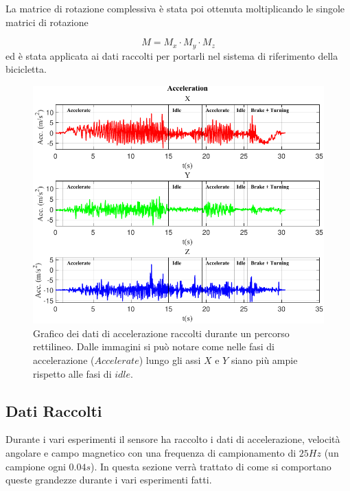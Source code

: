 \documentclass[class=article]{standalone}
\begin{document}
	La matrice di rotazione complessiva è stata poi ottenuta moltiplicando le singole matrici di rotazione 
	
	\[M=M_{x}\cdot M_{y}\cdot M_{z}\]
	ed è stata applicata ai dati raccolti per portarli nel sistema di riferimento della bicicletta.
	
	\begin{center}
		\begin{figure}[h]
			\centering\includegraphics[width=.9\textwidth]{img/Acc LungaF.pdf}
			\caption[]{Grafico dei dati di accelerazione raccolti durante un percorso rettilineo. Dalle immagini si può notare come nelle fasi di accelerazione (\(Accelerate\))  lungo gli assi \(X\) e \(Y\) siano più ampie rispetto alle fasi di \(idle\).}
			\label{fig:AccLunga}
		\end{figure}
	\end{center}
	
	\subsection{Dati Raccolti}
	Durante i vari esperimenti il sensore ha raccolto i dati di accelerazione, velocità angolare e campo magnetico con una frequenza di campionamento di \(25Hz\) (un campione ogni \(0.04s\)). In questa sezione verrà trattato di come si comportano queste grandezze durante i vari esperimenti fatti.
	
\end{document}
